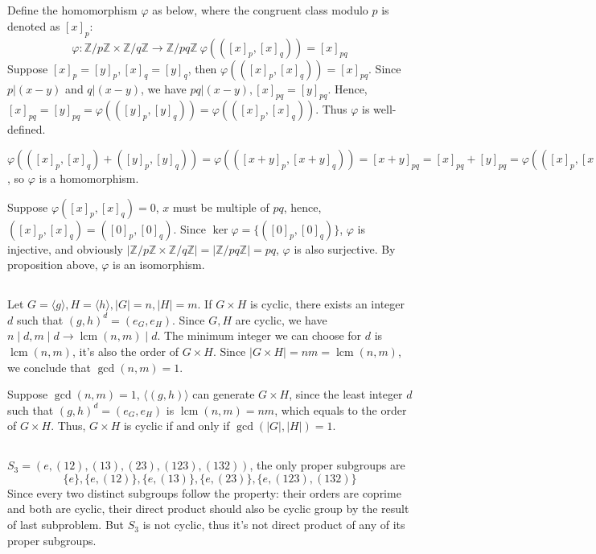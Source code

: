 \documentclass[12pt]{article}
\title{\mytitle}
\author{\textbf{\myauthor}}
\date{}
\DeclareMathOperator{\lcm}{lcm}
\begin{document}
\onehalfspacing
\maketitle

\section{}
\subsection{}
Define the homomorphism $\varphi$ as below, where the congruent class modulo $p$ is denoted as $[x]_p$:
$$\varphi:\mathbb{Z}/p\mathbb{Z}\times \mathbb{Z}/q\mathbb{Z}\rightarrow \mathbb{Z}/pq\mathbb{Z}\ \varphi(([x]_p,[x]_q))=[x]_{pq}$$
Suppose $[x]_p=[y]_p,[x]_q=[y]_q$, then $\varphi(([x]_p,[x]_q))=[x]_{pq}$. Since $p|(x-y)$ and $q|(x-y)$, we have $pq|(x-y), [x]_{pq}=[y]_{pq}$. Hence, $[x]_{pq}=[y]_{pq}=\varphi(([y]_{p},[y]_{q}))=\varphi(([x]_p,[x]_q))$. Thus $\varphi$ is well-defined.

$\varphi(([x]_p,[x]_q)+([y]_p,[y]_q))=\varphi(([x+y]_p,[x+y]_q))=[x+y]_{pq}=[x]_{pq}+[y]_{pq}=\varphi(([x]_p,[x]_q))+\varphi(([y]_p,[y]_q))$, so $\varphi$ is a homomorphism.

Suppose $\varphi([x]_p,[x]_q)=0$, $x$ must be multiple of $pq$, hence, $([x]_p,[x]_q)=([0]_p,[0]_q)$. Since $\ker{\varphi}=\{([0]_p,[0]_q)\}$, $\varphi$ is injective, and obviously $|\mathbb{Z}/p\mathbb{Z}\times \mathbb{Z}/q\mathbb{Z}|=|\mathbb{Z}/pq\mathbb{Z}|=pq$, $\varphi$ is also surjective. By proposition above, $\varphi$ is an isomorphism.
\subsection{}
Let $G=\langle g \rangle,H=\langle h\rangle, |G|=n, |H|=m$. If $G\times H$ is cyclic, there exists an integer $d$ such that $(g,h)^d=(e_G,e_H)$. Since $G,H$ are cyclic, we have $n\mid d,m\mid d\rightarrow\lcm{(n,m)}\mid d$. The minimum integer we can choose for $d$ is $\lcm{(n,m)}$, it's also the order of $G\times H$. Since $|G\times H|=nm=\lcm{(n,m)}$, we conclude that $\gcd{(n,m)}=1$.

Suppose $\gcd{(n,m)}=1$, $\langle (g,h)\rangle$ can generate $G\times H$, since the least integer $d$ such that $(g,h)^d=(e_G,e_H)$ is $\lcm{(n,m)}=nm$, which equals to the order of $G\times H$. Thus, $G\times H$ is cyclic if and only if $\gcd{(|G|,|H|)}=1$.
\subsection{}
$S_3=(e,(12),(13),(23),(123),(132))$, the only proper subgroups are 
$$\{e\}, \{e,(12)\}, \{e,(13)\},\{e, (23)\},\{e,(123),(132)\}$$
 Since every two distinct subgroups follow the property: their orders are coprime and both are cyclic, their direct product should also be cyclic group by the result of last subproblem. But $S_3$ is not cyclic, thus it's not direct product of any of its proper subgroups.
\end{document}
